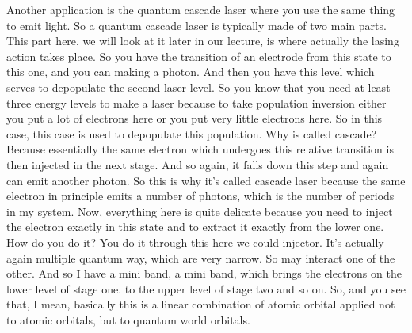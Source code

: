 Another application is the quantum cascade laser where you use the same thing to emit light. So a quantum cascade laser is typically made of two main parts. This part here, we will look at it later in our lecture, is where actually the lasing action takes place. So you have the transition of an electrode from this state to this one, and you can making a photon. And then you have this level which serves to depopulate the second laser level. So you know that you need at least three energy levels to make a laser because to take population inversion either you put a lot of electrons here or you put very little electrons here. So in this case, this case is used to depopulate this population. Why is called cascade? Because essentially the same electron which undergoes this relative transition is then injected in the next stage. And so again, it falls down this step and again can emit another photon. So this is why it's called cascade laser because the same electron in principle emits a number of photons, which is the number of periods in my system. Now, everything here is quite delicate because you need to inject the electron exactly in this state and to extract it exactly from the lower one. How do you do it? You do it through this here we could injector. It's actually again multiple quantum way, which are very narrow. So may interact one of the other. And so I have a mini band, a mini band, which brings the electrons on the lower level of stage one. to the upper level of stage two and so on. So, and you see that, I mean, basically this is a linear combination of atomic orbital applied not to atomic orbitals, but to quantum world orbitals.